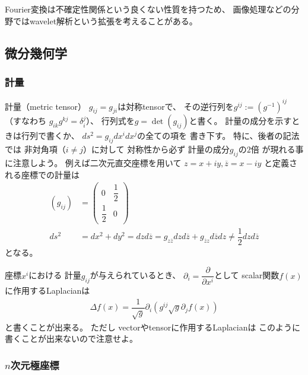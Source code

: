 Fourier変換は不確定性関係という良くない性質を持つため、
画像処理などの分野ではwavelet解析という拡張を考えることがある。

\newpage
\subsection{微分幾何学}

\subsubsection{計量}

計量（metric tensor）
$g_{ij} = g_{ji}$は対称tensorで、
その逆行列を$g^{ij} := (g^{-1})^{ij}$
（すなわち
$g_{ik} g^{kj} = \delta_i^j$）、
行列式を$g = \det (g_{ij})$と書く。
計量の成分を示すときは行列で書くか、
$ds^2 = g_{ij} dx^i dx^j$の全ての項を
書き下す。
特に、後者の記法では
非対角項（$i \neq j$）に対して
対称性から必ず
計量の成分$g_{ij}$の$2$倍
が現れる事に注意しよう。
例えば二次元直交座標を用いて
$z = x + i y,
\overline{z} = x - i y$
と定義される座標での計量は
\begin{subequations}
\begin{align}
    (g_{ij})
&=
    \begin{pmatrix}
        0 & \dfrac{1}{2}
    \\
        \dfrac{1}{2} & 0
    \end{pmatrix}
\\
    ds^2
&=
    dx^2 + dy^2
=
    d z
    d \overline{z}
=
    g_{z \overline{z}}
    d z
    d \overline{z}
+
    g_{\overline{z} z}
    d \overline{z}
    d z
\neq \dfrac{1}{2} 
    d z
    d \overline{z}
\end{align}
\end{subequations}
となる。

座標$x^i$における
計量$g_{ij}$が与えられているとき、
$\partial_i = \dfrac{\partial}{\partial x^i}$として
scalar関数$f(x)$に作用するLaplacianは
\begin{align}
    \Delta f(x)
    =
    \dfrac{1}{ \sqrt {g} }
    \partial_i
    \left(
        g^{ij}
        \sqrt{ g }
        \partial_j
        f (x)
    \right)
\label{laplacian of scalar in terms of metric}
\end{align}
と書くことが出来る。
ただし
vectorやtensorに作用するLaplacianは
このように書くことが出来ないので注意せよ。

\subsubsection{$n$次元極座標}

